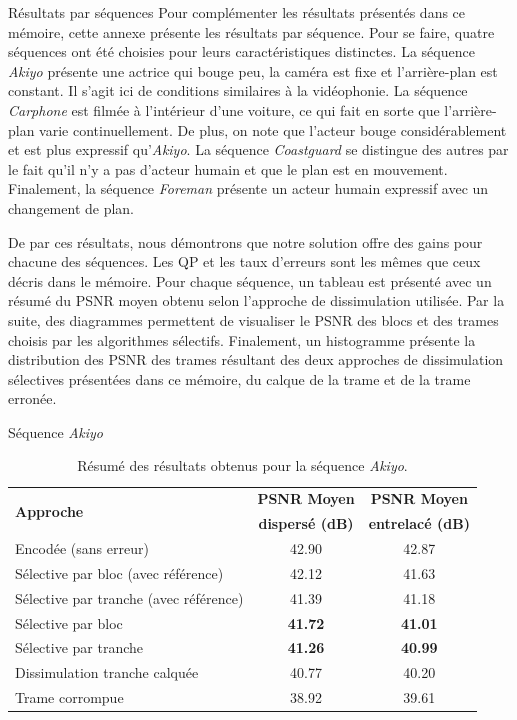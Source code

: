 \begin{section}{Résultats par séquences}
Pour complémenter les résultats présentés dans ce mémoire, cette annexe présente
les résultats par séquence. Pour se faire, quatre séquences ont été choisies
pour leurs caractéristiques distinctes. La séquence \textit{Akiyo} présente une
actrice qui bouge peu, la caméra est fixe et l'arrière-plan est constant. Il
s'agit ici de conditions similaires à la vidéophonie. La séquence
\textit{Carphone} est filmée à l'intérieur d'une voiture, ce qui fait en sorte
que l'arrière-plan varie continuellement. De plus, on note que l'acteur bouge
considérablement et est plus expressif qu'\textit{Akiyo}. La séquence
\textit{Coastguard} se distingue des autres par le fait qu'il n'y a pas
d'acteur humain et que le plan est en mouvement. Finalement, la séquence
\textit{Foreman} présente un acteur humain expressif avec un changement de plan.

De par ces résultats, nous démontrons que notre solution offre des gains pour
chacune des séquences. Les QP et les taux d'erreurs sont les mêmes que ceux
décris dans le mémoire. Pour chaque séquence, un tableau est présenté avec un
résumé du PSNR moyen obtenu selon l'approche de dissimulation utilisée. Par la
suite, des diagrammes permettent de visualiser le PSNR des blocs et des trames
choisis par les algorithmes sélectifs. Finalement, un histogramme présente
la distribution des PSNR des trames résultant des deux approches de
dissimulation sélectives présentées dans ce mémoire, du calque de la trame et de
la trame erronée.

\newpage

\begin{subsection}{Séquence \textit{Akiyo}}
\begin{table}
\caption[Résumé des résultats obtenus pour la séquence \textit{Akiyo}]{Résumé
des résultats obtenus pour la séquence \textit{Akiyo}.}
\centering
\begin{tabular}{| l | c | c |}
 \hline
 \multirow{2}{*}{\textbf{Approche}} & \textbf{PSNR Moyen}& \textbf{PSNR Moyen}\\
 &\textbf{dispersé (dB)}&\textbf{entrelacé (dB)}\\
 \hline
Encodée (sans erreur) & 42.90 & 42.87\\
Sélective par bloc (avec référence) & 42.12 & 41.63\\
Sélective par tranche (avec référence) & 41.39 &41.18\\
Sélective par bloc & \textbf{41.72} &\textbf{41.01}\\
Sélective par tranche &  \textbf{41.26} &\textbf{40.99}\\
Dissimulation tranche calquée & 40.77 &40.20\\
Trame corrompue & 38.92 &39.61\\
\hline
\end{tabular}
\end{table}


\end{subsection}
\end{section}

